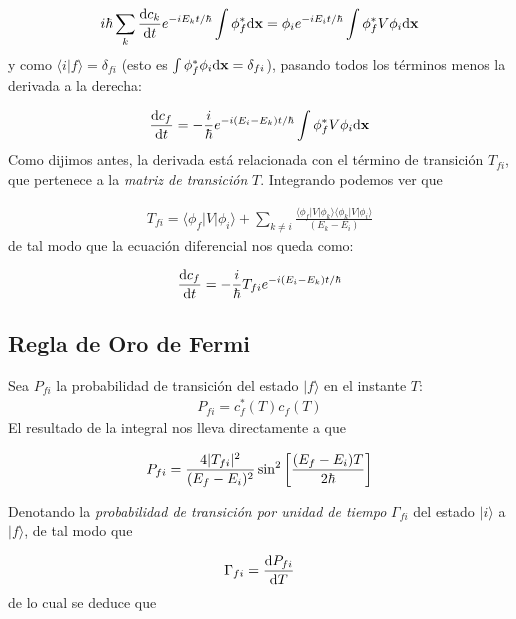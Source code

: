 \begin{eqnarray*}
	i \hbar \sum_k \frac{\mathrm{d} c_k}{\mathrm{d} t} e^{-iE_kt/\hbar} \int \phi_f^*  \mathrm{d} \mathbf{x}  = \phi_i e^{-iE_it/\hbar}\int \phi_f^* V \phi_i \mathrm{d} \mathbf{x}
\end{eqnarray*}
y como $\langle i | f\rangle=\delta_{fi}$ (esto es $\int \phi_f^* \phi_i \mathrm{d} \mathbf{x}=\delta_{fi}$), pasando todos los términos menos la derivada a la derecha:

\begin{eqnarray}
	  \frac{\mathrm{d} c_f}{\mathrm{d} t} = -\frac{i}{\hbar} e^{-i(E_i-E_k)t/\hbar}\int \phi_f^* V \phi_i \mathrm{d} \mathbf{x}
\end{eqnarray}
Como dijimos antes, la derivada está relacionada con el término de transición $T_{fi}$, que pertenece a la \textit{matriz de transición} $T$. Integrando podemos ver que

\begin{eqnarray}
	T_{fi} = \langle \phi_f | V |\phi_i \rangle + \sum_{k\neq i} \frac{\langle \phi_f |V|\phi_k \rangle \langle \phi_k |V|\phi_i\rangle }{(E_k - E_i)}
\end{eqnarray}
de tal modo que la ecuación diferencial nos queda como:

\begin{eqnarray}
	\frac{\mathrm{d} c_f}{\mathrm{d} t} = - \frac{i}{\hbar} T_{fi} e^{-i(E_i-E_k)t/\hbar}
\end{eqnarray} 

\subsection{Regla de Oro de Fermi}

Sea $P_{fi}$ la probabilidad de transición del estado $|f\rangle$ en el instante $T$:
\begin{eqnarray}
	P_{fi} = c_f^*(T) c_f(T)
\end{eqnarray}
El resultado de la integral nos lleva directamente a que

\begin{eqnarray}
	P_{fi} = \frac{4|T_{fi}|^2}{(E_f-E_i)^2} \sin^2 \left[ \frac{(E_f-E_i)T}{2\hbar} \right]
\end{eqnarray}

Denotando la \textit{probabilidad de transición por unidad de tiempo} $\Gamma_{fi}$ del estado $|i\rangle$ a $|f\rangle$, de tal modo que

\begin{eqnarray}
	\Gamma_{fi} = \frac{\mathrm{d} P_{fi}}{\mathrm{d} T}
\end{eqnarray}
de lo cual se deduce que 

